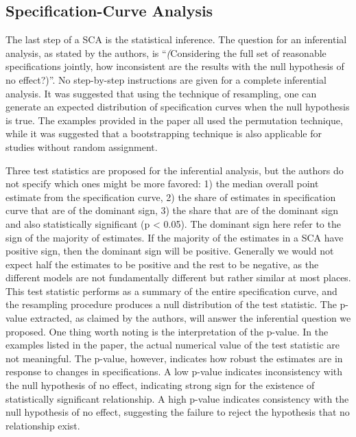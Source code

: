 \documentclass[12pt,twoside]{reedthesis}
\begin{document}
  \subsection{Specification-Curve
  Analysis}\label{specification-curve-analysis-1}
  
  \par 
  
  The last step of a SCA is the statistical inference. The question for an
  inferential analysis, as stated by the authors, is ``\emph(Considering
  the full set of reasonable specifications jointly, how inconsistent are
  the results with the null hypothesis of no effect?)''. No step-by-step
  instructions are given for a complete inferential analysis. It was
  suggested that using the technique of resampling, one can generate an
  expected distribution of specification curves when the null hypothesis
  is true. The examples provided in the paper all used the permutation
  technique, while it was suggested that a bootstrapping technique is also
  applicable for studies without random assignment.
  
  \par 
  
  Three test statistics are proposed for the inferential analysis, but the
  authors do not specify which ones might be more favored: 1) the median
  overall point estimate from the specification curve, 2) the share of
  estimates in specification curve that are of the dominant sign, 3) the
  share that are of the dominant sign and also statistically significant
  (p \textless{} 0.05). The dominant sign here refer to the sign of the
  majority of estimates. If the majority of the estimates in a SCA have
  positive sign, then the dominant sign will be positive. Generally we
  would not expect half the estimates to be positive and the rest to be
  negative, as the different models are not fundamentally different but
  rather similar at most places. This test statistic performs as a summary
  of the entire specification curve, and the resampling procedure produces
  a null distribution of the test statistic. The p-value extracted, as
  claimed by the authors, will answer the inferential question we
  proposed. One thing worth noting is the interpretation of the p-value.
  In the examples listed in the paper, the actual numerical value of the
  test statistic are not meaningful. The p-value, however, indicates how
  robust the estimates are in response to changes in specifications. A low
  p-value indicates inconsistency with the null hypothesis of no effect,
  indicating strong sign for the existence of statistically significant
  relationship. A high p-value indicates consistency with the null
  hypothesis of no effect, suggesting the failure to reject the hypothesis
  that no relationship exist.
  
\end{document}
